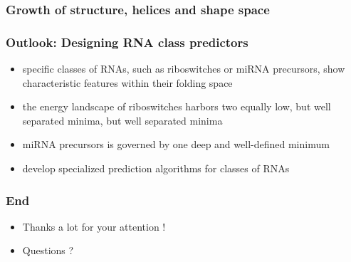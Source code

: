 \documentclass[ignorenonframetext,10pt]{beamer}
\begin{document}
\begin{frame}
\frametitle{Growth of structure, helices and shape space}
    \centering

\end{frame}

\begin{frame}
\frametitle{Outlook: Designing RNA class predictors}
    \begin{itemize} 
    \item specific classes of RNAs, such as riboswitches or miRNA precursors,
    show characteristic features within their folding space
    \item the energy landscape of riboswitches harbors two equally low, but well
    separated minima, but well separated minima
    \item miRNA precursors is governed by one deep and well-defined minimum
    \item develop specialized prediction algorithms for classes of RNAs
    \end{itemize}
\end{frame}

\begin{frame}
\frametitle{End}
   \begin{itemize} 
   \item Thanks a lot for your attention !
   \item Questions ?
   \end{itemize}
\end{frame}
\end{document}
